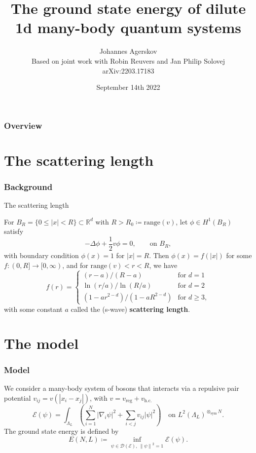 \documentclass{beamer}[10]
\title{The ground state energy of dilute 1d many-body quantum systems}
\subtitle{}
\author{Johannes Agerskov\\\vspace{0.2 cm}
	\scriptsize{Based on joint work with Robin Reuvers and Jan Philip Solovej\\
		arXiv:2203.17183}}
\institute{QMATH \\ University of Copenhagen}
\date{September 14th 2022}
\newcommand{\norm}[1]{\left\lVert #1 \right\rVert}
\newcommand{\abs}[1]{\left\lvert #1 \right\rvert}
\newcommand{\R}{\mathbb{R}}
\begin{document}
\frame{\titlepage \vspace{-0.5cm}
}

\frame
{
\frametitle{Overview}
\tableofcontents%
}

\section{The scattering length}

\begin{frame}
\frametitle{Background}
\vspace*{-0.2cm}
\begin{block}{The scattering length}
	\vspace*{-0.4cm}
	\small\begin{theorem}
		For $ B_R=\{0\leq\abs{x}<R\}\subset \R^d $ with $ R>R_0\coloneqq\text{range}(v) $, let $ \phi\in H^1(B_{R}) $ satisfy
	 \begin{equation}
		 -\Delta \phi +\frac12 v\phi=0,\qquad \text{on }B_R,
		 \end{equation}
		 with boundary condition $ \phi(x)=1 $ for $ \abs{x}=R$.
		 Then $ \phi(x)=f(\abs{x}) $ for some $ f:(0,R]\to [0,\infty) $, and for $ \text{range}(v)<r<R $, we have \begin{equation}
		 f(r)=\begin{cases}
		 (r-a)/(R-a) &\text{for }d=1\\
		 \ln(r/a)/\ln(R/a) &\text{for }d=2\\
		 (1-ar^{2-d})/(1-aR^{2-d})&\text{for }d\geq 3,
		 \end{cases}
		 \end{equation}
		 with some constant $ a $ called the (s-wave) \textbf{scattering length}.
	\end{theorem}
\end{block}	
\end{frame}
\section{The model}
\begin{frame}
	\frametitle{Model}
	We consider a many-body system of bosons that interacts via a repulsive pair potential $ v_{ij}=v(\abs{x_i-x_j}) $, with $ v=v_{\text{reg}}+v_{\text{h.c.}} $\begin{equation}
	\mathcal{E}(\psi)=\int_{\Lambda_L}\left(\sum_{i=1}^{N}\abs{\nabla_i\psi}^2+\sum_{i<j} v_{ij}\abs{\psi}^2\right)\quad \text{on } L^2(\Lambda_L)^{\otimes_{\text{sym}} N}.
	\end{equation}
	The ground state energy is defined by 
	$$
	E(N,L)\coloneqq\inf_{\psi\in\mathcal{D}(\mathcal{E}),\ \norm{\psi}^2=1}\mathcal{E}(\psi).
	$$
\end{frame}
\end{document}
